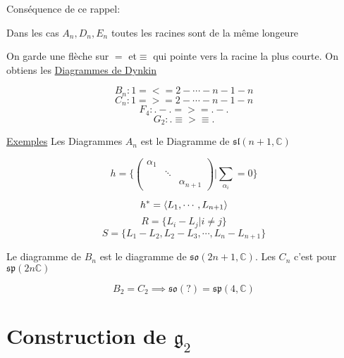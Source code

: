 Conséquence de ce rappel:

Dans les cas \(A_n, D_n , E_n \) toutes les racines sont de la même longeure 

On garde une flèche sur \(=\) et\(\equiv\) qui pointe vers la racine la plus courte. On obtiens les \underline{Diagrammes de Dynkin} 


\[ B_n  : 1 =<= 2 - \dotsb- n-1 - n\]
\[ C_n  : 1 =>= 2 - \dotsb- n-1 - n\]
\[ F_4 : . - . =>= . - . \]
\[ G_2: . \equiv>\equiv . \]


\underline{Exemples} 
Les Diagrammes \(A_n \) est le Diagramme de \(\mathfrak{sl}(n+1 ,\mathds{C})\)

\[ h = \{ \begin{pmatrix} \alpha_1 \\ & \ddots \\&&\alpha_{n+1}  \end{pmatrix} | \sum_{\alpha_i} =0 \}  \]

\[ h^{*} = \expval{L_1 , \dotsb , L_{n+1} } \]
\[ R = \{ L_i - L_j | i \neq j \}  \]
\[ S = \{ L_1 - L_2 , L_2 - L_{3}, \dotsb , L_n - L_{n+1}  \}  \]

Le diagramme de \(B_n \) est le diagramme de \(\mathfrak{so}(2n+1 , \mathds{C}) \). Les \(C_n \) c'est pour \(\mathfrak{sp}(2n \mathds{C})\)

\[ B_2 = C_2 \implies \mathfrak{so(?)} = \mathfrak{sp}(4, \mathds{C})\]

\section*{Construction de \(	\mathfrak{g}_2\)}



